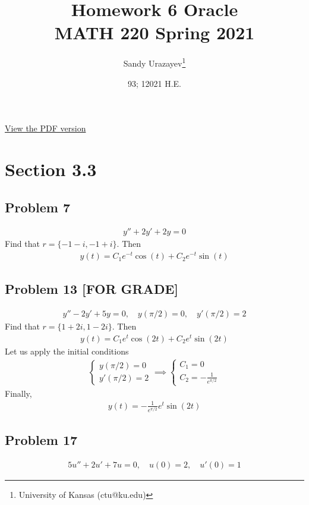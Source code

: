 \documentclass[12pt]{article}
\author{Sandy Urazayev\thanks{University of Kansas (ctu@ku.edu)}}
\date{93; 12021 H.E.}
\title{Homework 6 Oracle\\\medskip
\large MATH 220 Spring 2021}
\begin{document}
\maketitle
\href{./index.pdf}{View the PDF version​}

\section*{Section 3.3}
\label{sec:orgb309973}
\subsection*{Problem 7}
\label{sec:org634be96}
\begin{align*}
  y'' + 2y' + 2y = 0
\end{align*}
Find that \(r = \{-1 - i, -1 + i\}\). Then
\begin{align*}
  y(t) = C_1 e^{-t} \cos (t) + C_2 e^{-t} \sin (t)
\end{align*}
\subsection*{Problem 13 [FOR GRADE]}
\label{sec:org918d984}
\begin{align*}
  y'' - 2y' + 5y = 0, \quad y(\pi/2) = 0, \quad y'(\pi / 2) = 2
\end{align*}
Find that \(r = \{1+2i,1-2i\}\). Then
\begin{align*}
  y(t) = C_1 e^t \cos (2t) + C_2 e^t \sin (2t)
\end{align*}
Let us apply the initial conditions
\begin{align*}
  \begin{cases}
    y(\pi/2)=0\\
    y'(\pi/2)=2
    \end{cases} \implies
  \begin{cases}
    C_1 = 0\\
    C_2 = -\frac{1}{e^{\pi/2}}
    \end{cases}
\end{align*}
Finally,
\begin{align*}
  y(t) = -\frac{1}{e^{\pi/2}} e^t \sin (2t)
\end{align*}
\subsection*{Problem 17}
\label{sec:org8503826}
\begin{align*}
  5u'' + 2u' + 7u = 0, \quad u(0) = 2, \quad u'(0) = 1
\end{align*}
\end{document}
